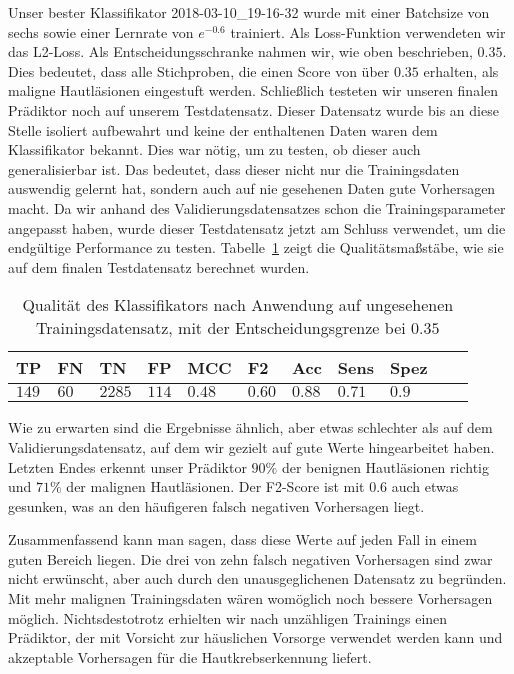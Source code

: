 Unser bester Klassifikator 2018-03-10\_19-16-32 wurde mit einer Batchsize von sechs sowie einer Lernrate von $e^{-0.6}$ trainiert. Als Loss-Funktion verwendeten wir das L2-Loss. Als Entscheidungsschranke nahmen wir, wie oben beschrieben, $0.35$. Dies bedeutet, dass alle Stichproben, die einen Score von über $0.35$ erhalten, als maligne Hautläsionen eingestuft werden. Schließlich testeten wir unseren finalen Prädiktor noch auf unserem Testdatensatz. Dieser Datensatz wurde bis an diese Stelle isoliert aufbewahrt und keine der enthaltenen Daten waren dem Klassifikator bekannt. Dies war nötig, um zu testen, ob dieser auch generalisierbar ist. Das bedeutet, dass dieser nicht nur die Trainingsdaten auswendig gelernt hat, sondern auch auf nie gesehenen Daten gute Vorhersagen macht. Da wir anhand des Validierungsdatensatzes schon die Trainingsparameter angepasst haben, wurde dieser Testdatensatz jetzt am Schluss verwendet, um die endgültige Performance zu testen. Tabelle~\ref{tab:test_scores} zeigt die Qualitätsmaßstäbe, wie sie auf dem finalen Testdatensatz berechnet wurden.

\begin{table}[htb!]
\begin{center}
\begin{tabular}{lllllllllll}
	\toprule
 	TP & FN & TN & FP & MCC & F2 & Acc & Sens & Spez\\
	\midrule
    $149$&	$60$ &	$2285$ &	$114$ &	$0.48$ 	&$0.60$	&$0.88$	&$0.71$&	$0.9$ \\
 \bottomrule
 \end{tabular}
 \end{center}
  \caption{Qualität des Klassifikators nach Anwendung auf ungesehenen Trainingsdatensatz, mit der Entscheidungsgrenze bei $0.35$}
 \label{tab:test_scores}
 \end{table}

 Wie zu erwarten sind die Ergebnisse ähnlich, aber etwas schlechter als auf dem Validierungsdatensatz, auf dem wir gezielt auf gute Werte hingearbeitet haben. Letzten Endes erkennt unser Prädiktor $90\%$ der benignen Hautläsionen richtig und $71\%$ der malignen Hautläsionen. Der F2-Score ist mit $0.6$ auch etwas gesunken, was an den häufigeren falsch negativen Vorhersagen liegt.

Zusammenfassend kann man sagen, dass diese Werte auf jeden Fall in einem guten Bereich liegen. Die drei von zehn falsch negativen Vorhersagen sind zwar nicht erwünscht, aber auch durch den unausgeglichenen Datensatz zu begründen. Mit mehr malignen Trainingsdaten wären womöglich noch bessere Vorhersagen möglich. Nichtsdestotrotz erhielten wir nach unzähligen Trainings einen Prädiktor, der mit Vorsicht zur häuslichen Vorsorge verwendet werden kann und akzeptable Vorhersagen für die Hautkrebserkennung liefert.


